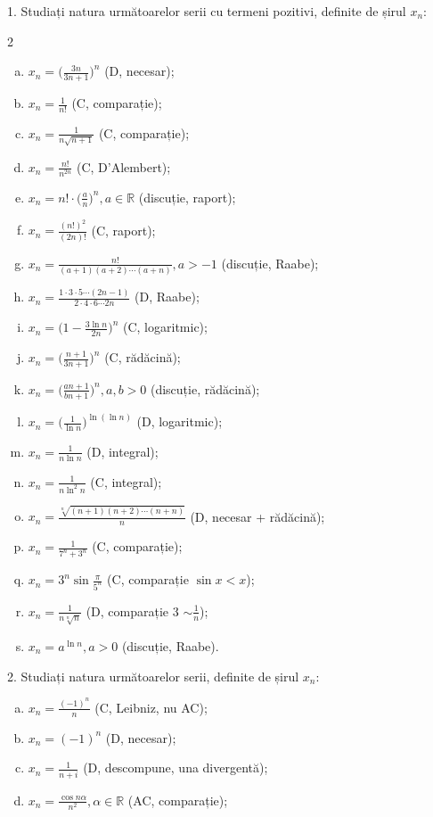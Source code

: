 \documentclass[11pt,a4paper]{article}
\newcommand\RR{\mathbb{R}}
\theoremstyle{dotless}
\theoremstyle{dotlessdr}
\begin{document}
1. Studiați natura următoarelor serii cu termeni pozitivi, definite de șirul $x_n$:
\begin{multicols}{2}
  \begin{enumerate}[(a)]
    \item $x_n = \Big( \frac{3n}{3n + 1} \Big)^n$ (D, necesar);
    \item $x_n = \frac{1}{n!}$ (C, comparație);
    \item $x_n = \frac{1}{n \sqrt{n + 1}}$ (C, comparație);
    \item $x_n = \frac{n!}{n^{2n}}$ (C, D'Alembert);
    \item $x_n = n! \cdot \Big( \frac{a}{n} \Big)^n, a \in \RR$ (discuție, raport);
    \item $x_n = \frac{(n!)^2}{(2n)!}$ (C, raport);
    \item $x_n = \frac{n!}{(a + 1)(a + 2) \cdots (a + n)}, a > -1$ (discuție, Raabe);
    \item $x_n = \frac{1 \cdot 3 \cdot 5 \cdots (2n - 1)}{2 \cdot 4 \cdot 6 \cdots 2n}$ (D, Raabe);
    \item $x_n = \Big( 1 - \frac{3 \ln n}{2n} \Big)^n$ (C, logaritmic);
    \item $x_n = \Big( \frac{n + 1}{3n + 1} \Big)^n$ (C, rădăcină);
    \item $x_n = \Big( \frac{an + 1}{bn + 1} \Big)^n, a, b > 0$ (discuție, rădăcină);
    \item $x_n = \Big( \frac{1}{\ln n} \Big)^{\ln(\ln n)}$ (D, logaritmic);
    \item $x_n = \frac{1}{n \ln n}$ (D, integral);
    \item $x_n = \frac{1}{n \ln^2 n}$ (C, integral);
    \item $x_n = \frac{\sqrt[n]{(n + 1) (n+2) \cdots (n + n)}}{n}$ (D, necesar + rădăcină);
    \item $x_n = \frac{1}{7^n + 3^n}$ (C, comparație);
    \item $x_n = 3^n \sin \frac{\pi}{5^n}$ (C, comparație $\sin x < x$);
    \item $x_n = \frac{1}{n \sqrt[n]{n}}$ (D, comparație 3 $\sim \frac{1}{n}$);
    \item $x_n = a^{\ln n}, a > 0$ (discuție, Raabe).
  \end{enumerate}
\end{multicols}

\vspace{1cm}

2. Studiați natura următoarelor serii, definite de șirul $x_n$:
\begin{enumerate}[(a)]
  \item $x_n = \frac{(-1)^n}{n}$ (C, Leibniz, nu AC);
  \item $x_n = (-1)^n$ (D, necesar);
  \item $x_n = \frac{1}{n + i}$ (D, descompune, una divergentă);
  \item $x_n = \frac{\cos n \alpha}{n^2}, \alpha \in \RR$ (AC, comparație);
\end{enumerate}
\end{document}
